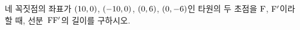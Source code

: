 네 꼭짓점의 좌표가 $(10{,}\mkern3mu\mathopen{}0)$, $(-10{,}\mkern3mu\mathopen{}0)$, $(0{,}\mkern3mu\mathopen{}6)$, $(0{,}\mkern3mu\mathopen{}-6)$인 타원의 두 초점을 $\mathrm{F}$, $\mathrm{F}'$이라 할 때, 선분~$\mathrm{FF'}$의 길이를 구하시오.
